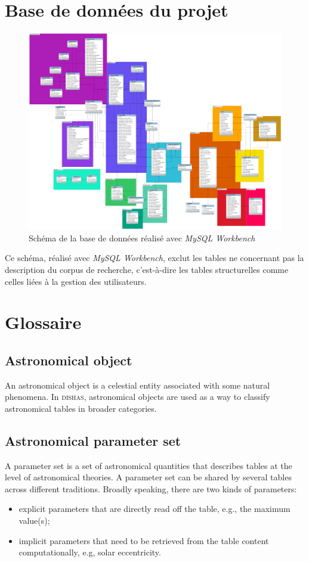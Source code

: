 \documentclass[a4paper,12pt,twoside]{book}
\newcommand{\clearemptydoublepage}{\newpage{\pagestyle{empty}\cleardoublepage}}
\begin{document}
	\chapter{\label{BaseDeDonnee}Base de données du projet}
	\begin{figure}
		\centering
		\includegraphics[width=18cm]{Annexes/Schema-Base_de_donnees.png}
		\caption{Schéma de la base de données réalisé avec \emph{MySQL Workbench}}
	\end{figure}
	
	Ce schéma, réalisé avec \emph{MySQL Workbench}, exclut les tables ne concernant pas la description du corpus de recherche, c'est-à-dire les tables structurelles comme celles liées à la gestion des utilisateurs.
	
\clearemptydoublepage

	\chapter{\label{Glossaire}Glossaire}
		\section{Astronomical object}
	An astronomical object is a celestial entity associated with some natural phenomena. In \textsc{dishas}, astronomical objects are used as a way to classify astronomical tables in broader categories.
	
		\section{Astronomical parameter set}
	A parameter set is a set of astronomical quantities that describes tables at the level of astronomical theories. A parameter set can be shared by several tables across different traditions. Broadly speaking, there are two kinds of parameters:
	\begin{itemize}
		\item explicit parameters that are directly read off the table, e.g., the maximum value(s);
		\item implicit parameters that need to be retrieved from the table content computationally, e.g, solar eccentricity.
	\end{itemize}
	
\end{document}
